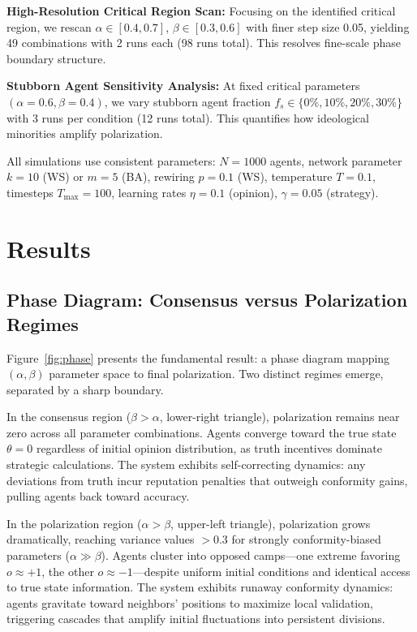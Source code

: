 \documentclass[11pt,a4paper]{article}
\begin{document}
\textbf{High-Resolution Critical Region Scan:} Focusing on the identified critical region, we rescan $\alpha \in [0.4, 0.7]$, $\beta \in [0.3, 0.6]$ with finer step size 0.05, yielding 49 combinations with 2 runs each (98 runs total). This resolves fine-scale phase boundary structure.

\textbf{Stubborn Agent Sensitivity Analysis:} At fixed critical parameters $(\alpha=0.6, \beta=0.4)$, we vary stubborn agent fraction $f_s \in \{0\%, 10\%, 20\%, 30\%\}$ with 3 runs per condition (12 runs total). This quantifies how ideological minorities amplify polarization.

All simulations use consistent parameters: $N=1000$ agents, network parameter $k=10$ (WS) or $m=5$ (BA), rewiring $p=0.1$ (WS), temperature $T=0.1$, timesteps $T_{\max}=100$, learning rates $\eta=0.1$ (opinion), $\gamma=0.05$ (strategy).

\section{Results}

\subsection{Phase Diagram: Consensus versus Polarization Regimes}

Figure~\ref{fig:phase} presents the fundamental result: a phase diagram mapping $(\alpha, \beta)$ parameter space to final polarization. Two distinct regimes emerge, separated by a sharp boundary.

In the consensus region ($\beta > \alpha$, lower-right triangle), polarization remains near zero across all parameter combinations. Agents converge toward the true state $\theta=0$ regardless of initial opinion distribution, as truth incentives dominate strategic calculations. The system exhibits self-correcting dynamics: any deviations from truth incur reputation penalties that outweigh conformity gains, pulling agents back toward accuracy.

In the polarization region ($\alpha > \beta$, upper-left triangle), polarization grows dramatically, reaching variance values $>0.3$ for strongly conformity-biased parameters ($\alpha \gg \beta$). Agents cluster into opposed camps—one extreme favoring $o \approx +1$, the other $o \approx -1$—despite uniform initial conditions and identical access to true state information. The system exhibits runaway conformity dynamics: agents gravitate toward neighbors' positions to maximize local validation, triggering cascades that amplify initial fluctuations into persistent divisions.
\end{document}
